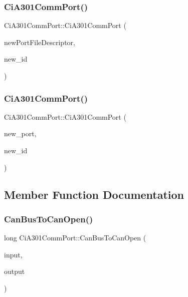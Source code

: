 \subsubsection{\texorpdfstring{Ci\+A301\+Comm\+Port()}{CiA301CommPort()}\hspace{0.1cm}{\footnotesize\ttfamily [1/2]}}
{\footnotesize\ttfamily Ci\+A301\+Comm\+Port\+::\+Ci\+A301\+Comm\+Port (\begin{DoxyParamCaption}\item[{int}]{new\+Port\+File\+Descriptor,  }\item[{uint8\+\_\+t}]{new\+\_\+id }\end{DoxyParamCaption})}

\mbox{\label{classCiA301CommPort_a1e05c4b292cfee36ff9eeddb2c8eb4c0}} 
\subsubsection{\texorpdfstring{Ci\+A301\+Comm\+Port()}{CiA301CommPort()}\hspace{0.1cm}{\footnotesize\ttfamily [2/2]}}
{\footnotesize\ttfamily Ci\+A301\+Comm\+Port\+::\+Ci\+A301\+Comm\+Port (\begin{DoxyParamCaption}\item[{\hyperlink{classPortBase}{Port\+Base} $\ast$}]{new\+\_\+port,  }\item[{uint8\+\_\+t}]{new\+\_\+id }\end{DoxyParamCaption})}



\subsection{Member Function Documentation}
\mbox{\label{classCiA301CommPort_aa16887712ea9cad534aacd4851f9190d}} 
\subsubsection{\texorpdfstring{Can\+Bus\+To\+Can\+Open()}{CanBusToCanOpen()}}
{\footnotesize\ttfamily long Ci\+A301\+Comm\+Port\+::\+Can\+Bus\+To\+Can\+Open (\begin{DoxyParamCaption}\item[{const \hyperlink{structcan__msg}{can\+\_\+msg} \&}]{input,  }\item[{\hyperlink{structco__msg}{co\+\_\+msg} \&}]{output }\end{DoxyParamCaption})\hspace{0.3cm}{\ttfamily [private]}}

